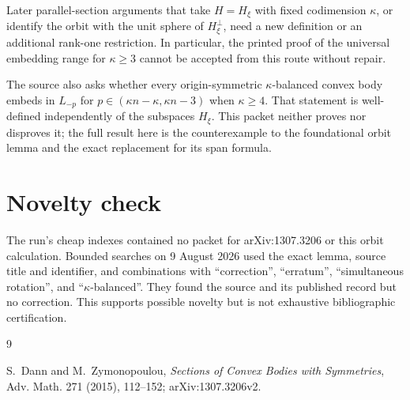 \documentclass[11pt]{article}
\begin{document}
Later parallel-section arguments that take $H=H_\xi$ with fixed codimension
$\kappa$, or identify the orbit with the unit sphere of $H_\xi^\perp$, need
a new definition or an additional rank-one restriction.  In particular,
the printed proof of the universal embedding range for $\kappa\geq3$ cannot
be accepted from this route without repair.

The source also asks whether every origin-symmetric $\kappa$-balanced convex
body embeds in $L_{-p}$ for
$p\in(\kappa n-\kappa,\kappa n-3)$ when $\kappa\geq4$.  That statement is
well-defined independently of the subspaces $H_\xi$.  This packet neither
proves nor disproves it; the full result here is the counterexample to the
foundational orbit lemma and the exact replacement for its span formula.

\section{Novelty check}

The run's cheap indexes contained no packet for arXiv:1307.3206 or this orbit
calculation.  Bounded searches on 9 August 2026 used the exact lemma, source
title and identifier, and combinations with ``correction'', ``erratum'',
``simultaneous rotation'', and ``$\kappa$-balanced''.  They found the source
and its published record but no correction.  This supports possible novelty
but is not exhaustive bibliographic certification.

\begin{thebibliography}{9}

S.~Dann and M.~Zymonopoulou,
\emph{Sections of Convex Bodies with Symmetries},
Adv. Math. 271 (2015), 112--152; arXiv:1307.3206v2.

\end{thebibliography}
\end{document}
